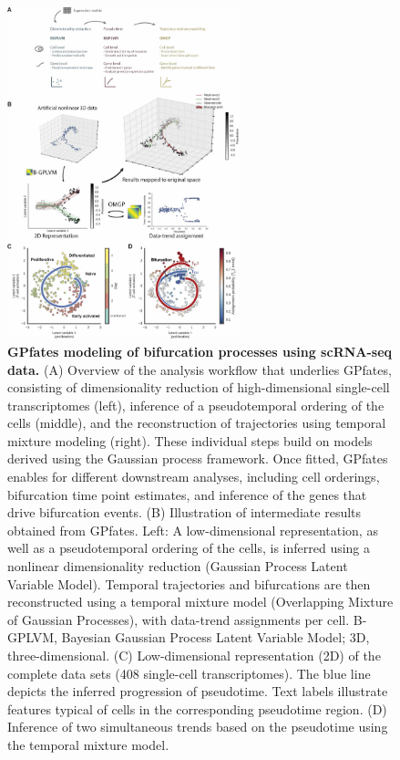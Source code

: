 \begin{figure}
    \centering
    \includegraphics[width=0.6\textwidth]{"Fig2"}
    \caption[GPfates modeling of bifurcation processes using scRNA-seq data]{\textbf{GPfates modeling of bifurcation processes using scRNA-seq data.} (A) Overview of the analysis workflow that underlies GPfates, consisting of dimensionality reduction of high-dimensional single-cell transcriptomes (left), inference of a pseudotemporal ordering of the cells (middle), and the reconstruction of trajectories using temporal mixture modeling (right). These individual steps build on models derived using the Gaussian process framework. Once fitted, GPfates enables for different downstream analyses, including cell orderings, bifurcation time point estimates, and inference of the genes that drive bifurcation events. (B) Illustration of intermediate results obtained from GPfates. Left: A low-dimensional representation, as well as a pseudotemporal ordering of the cells, is inferred using a nonlinear dimensionality reduction (Gaussian Process Latent Variable Model). Temporal trajectories and bifurcations are then reconstructed using a temporal mixture model (Overlapping Mixture of Gaussian Processes), with data-trend assignments per cell. B-GPLVM, Bayesian Gaussian Process Latent Variable Model; 3D, three-dimensional. (C) Low-dimensional representation (2D) of the complete data sets (408 single-cell transcriptomes). The blue line depicts the inferred progression of pseudotime. Text labels illustrate features typical of cells in the corresponding pseudotime region. (D) Inference of two simultaneous trends based on the pseudotime using the temporal mixture model.}
    \label{fig:models}
\end{figure}


